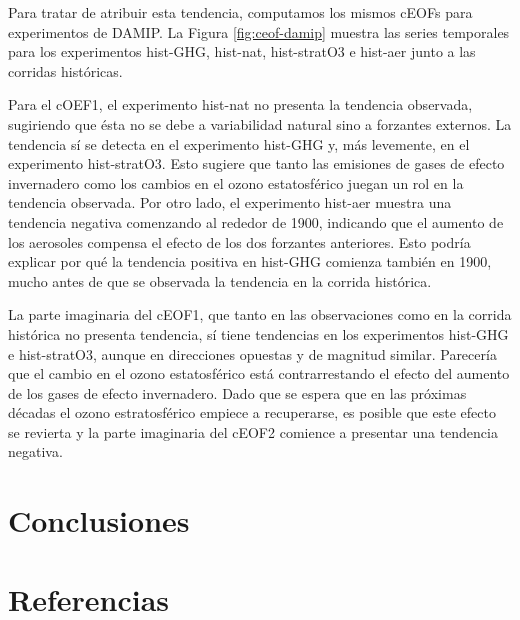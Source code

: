 \documentclass[12pt,oneside]{reedthesis}
\begin{document}
Para tratar de atribuir esta tendencia, computamos los mismos cEOFs para experimentos de DAMIP.
La Figura \ref{fig:ceof-damip} muestra las series temporales para los experimentos hist-GHG, hist-nat, hist-stratO3 e hist-aer junto a las corridas históricas.

Para el cOEF1, el experimento hist-nat no presenta la tendencia observada, sugiriendo que ésta no se debe a variabilidad natural sino a forzantes externos.
La tendencia sí se detecta en el experimento hist-GHG y, más levemente, en el experimento hist-stratO3.
Esto sugiere que tanto las emisiones de gases de efecto invernadero como los cambios en el ozono estatosférico juegan un rol en la tendencia observada.
Por otro lado, el experimento hist-aer muestra una tendencia negativa comenzando al rededor de 1900, indicando que el aumento de los aerosoles compensa el efecto de los dos forzantes anteriores.
Esto podría explicar por qué la tendencia positiva en hist-GHG comienza también en 1900, mucho antes de que se observada la tendencia en la corrida histórica.

La parte imaginaria del cEOF1, que tanto en las observaciones como en la corrida histórica no presenta tendencia, sí tiene tendencias en los experimentos hist-GHG e hist-stratO3, aunque en direcciones opuestas y de magnitud similar.
Parecería que el cambio en el ozono estatosférico está contrarrestando el efecto del aumento de los gases de efecto invernadero.
Dado que se espera que en las próximas décadas el ozono estratosférico empiece a recuperarse, es posible que este efecto se revierta y la parte imaginaria del cEOF2 comience a presentar una tendencia negativa.

\hypertarget{conclusiones}{%
\section{Conclusiones}\label{conclusiones}}

\backmatter

\hypertarget{referencias}{%
\section*{Referencias}\label{referencias}}


\noindent

\setlength{\parindent}{-0.20in}
\end{document}
